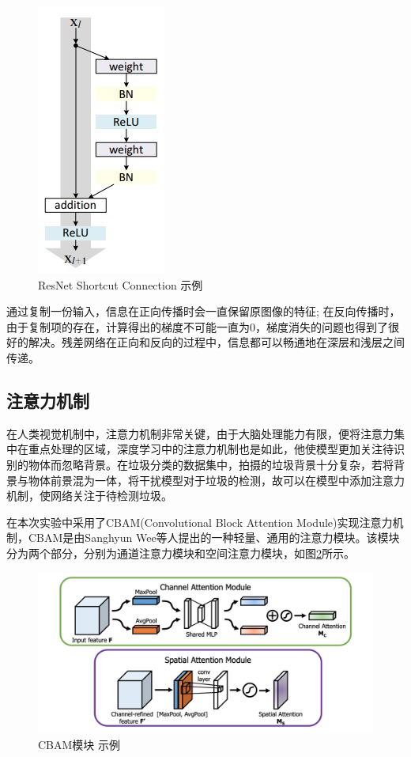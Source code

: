 \documentclass[a4paper]{article}
\begin{document}
\begin{CJK*}{UTF8}{gbsn}
\begin{figure}[h!]
\centering
\includegraphics[scale=0.5]{resident-block.jpg}
\caption{ResNet Shortcut Connection 示例}
\label{fig:resident_block}
\end{figure}

通过复制一份输入，信息在正向传播时会一直保留原图像的特征; 在反向传播时，由于复制项的存在，计算得出的梯度不可能一直为0，梯度消失的问题也得到了很好的解决。残差网络在正向和反向的过程中，信息都可以畅通地在深层和浅层之间传递。

\subsection{注意力机制}

在人类视觉机制中，注意力机制非常关键，由于大脑处理能力有限，便将注意力集中在重点处理的区域，深度学习中的注意力机制也是如此，他使模型更加关注待识别的物体而忽略背景。在垃圾分类的数据集中，拍摄的垃圾背景十分复杂，若将背景与物体前景混为一体，将干扰模型对于垃圾的检测，故可以在模型中添加注意力机制，使网络关注于待检测垃圾。

在本次实验中采用了CBAM(Convolutional Block Attention Module)实现注意力机制，CBAM是由Sanghyun Wee等人\cite{woo2018cbam}提出的一种轻量、通用的注意力模块。该模块分为两个部分，分别为通道注意力模块和空间注意力模块，如图\ref{fig:cbam}所示。

\begin{figure}[h!]
\centering
\includegraphics[scale=0.3]{cbam.jpg}
\caption{CBAM模块 示例}
\label{fig:cbam}
\end{figure}


\end{CJK*}
\end{document}
